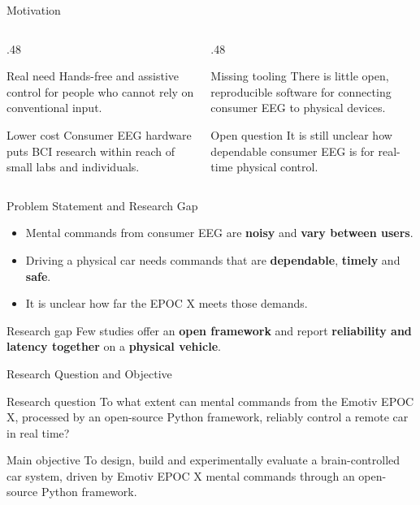 \documentclass[aspectratio=169,11pt]{beamer}
\begin{document}
\begin{frame}{Motivation}
  \begin{columns}[T]
    \begin{column}{.48\textwidth}
      \begin{block}{Real need}
        Hands-free and assistive control for people who cannot rely on conventional input.
      \end{block}
      \medskip
      \begin{block}{Lower cost}
        Consumer EEG hardware puts BCI research within reach of small labs and individuals.
      \end{block}
    \end{column}
    \begin{column}{.48\textwidth}
      \begin{block}{Missing tooling}
        There is little open, reproducible software for connecting consumer EEG to physical devices.
      \end{block}
      \medskip
      \begin{block}{Open question}
        It is still unclear how dependable consumer EEG is for real-time physical control.
      \end{block}
    \end{column}
  \end{columns}
\end{frame}

\begin{frame}{Problem Statement and Research Gap}
  \begin{itemize}
    \item Mental commands from consumer EEG are \textbf{noisy} and \textbf{vary between users}.
    \item Driving a physical car needs commands that are \textbf{dependable}, \textbf{timely} and \textbf{safe}.
    \item It is unclear how far the EPOC X meets those demands.
  \end{itemize}
  \bigskip
  \begin{block}{Research gap}
    Few studies offer an \textbf{open framework} and report \textbf{reliability and latency together} on a \textbf{physical vehicle}.
  \end{block}
\end{frame}

\begin{frame}{Research Question and Objective}
  \vspace{.5em}
  \begin{block}{Research question}
    \large To what extent can mental commands from the Emotiv EPOC X, processed by an open-source Python framework, reliably control a remote car in real time?
  \end{block}
  \bigskip
  \begin{block}{Main objective}
    To design, build and experimentally evaluate a brain-controlled car system, driven by Emotiv EPOC X mental commands through an open-source Python framework.
  \end{block}
\end{frame}
\end{document}
